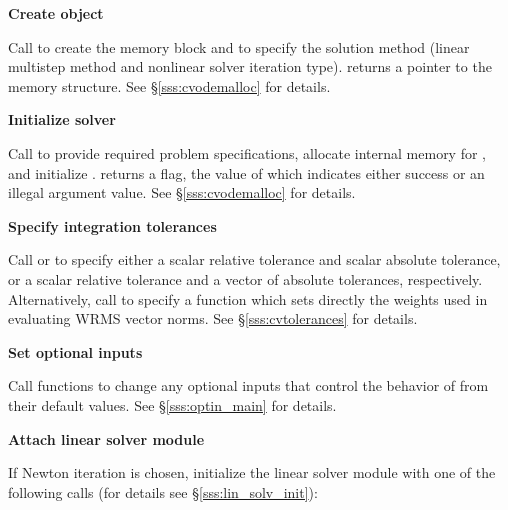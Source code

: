 \begin{Steps}
\item\label{i:cvode_create} 
  {\bf Create {\cvodes} object}

  Call  
  to create the {\cvodes} memory block and to specify the solution method
  (linear multistep method and nonlinear solver iteration type).
   returns a pointer to the {\cvodes} memory structure.
  See \S\ref{sss:cvodemalloc} for details.

\item\label{i:cvode_malloc} 
  {\bf Initialize {\cvodes} solver}

  Call  
  to provide required problem specifications, allocate internal memory for
  {\cvodes}, and initialize {\cvodes}.
   returns a flag, the value of which indicates either success or
  an illegal argument value.  See \S\ref{sss:cvodemalloc} for details.
  
\item
  {\bf Specify integration tolerances}

  Call  or 
  to specify either a scalar relative tolerance and scalar absolute tolerance, or
  a scalar relative tolerance and a vector of absolute tolerances, respectively.
  Alternatively, call  to specify a function which sets 
  directly the weights used in evaluating WRMS vector norms.
  See \S\ref{sss:cvtolerances} for details.

\item
  {\bf Set optional inputs}

  Call  functions to change any
  optional inputs that control the behavior of {\cvodes} from their default values.
  See \S\ref{sss:optin_main} for details.

\item\label{i:lin_solver} 
  {\bf Attach linear solver module}

  If Newton iteration is chosen, initialize the linear solver module
  with one of the following calls (for details see \S\ref{sss:lin_solv_init}):







\end{Steps}
